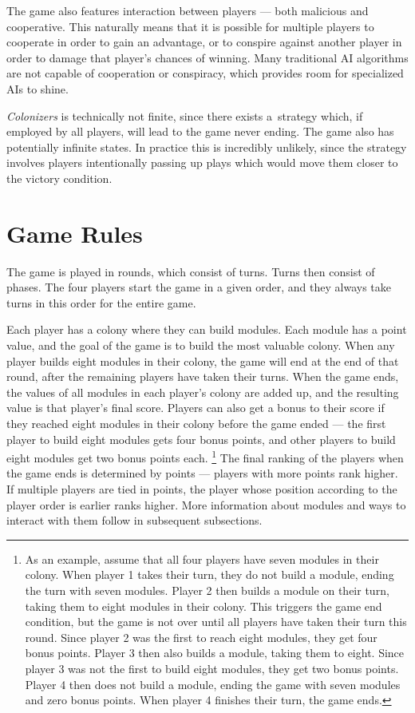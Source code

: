 The game also features interaction between players --- both malicious and cooperative.
This naturally means that it is possible for multiple players to cooperate in order
to gain an advantage, or to conspire against another player in order to damage
that player's chances of winning. Many traditional AI algorithms are not capable
of cooperation or conspiracy, which provides room for specialized AIs to shine.

\emph{Colonizers} is technically not finite, since there exists a~strategy which,
if employed by all players, will lead to the game never ending. The game also
has potentially infinite states. In practice this
is incredibly unlikely, since the strategy involves players intentionally
passing up plays which would move them closer to the victory condition.

\section{Game Rules}
\label{chap:gamerules}

The game is played in rounds, which consist of turns. Turns then consist of phases.
The four players start the game in a given order, and they always take turns
in this order for the entire game.

Each player has a colony where they can build modules.
Each module has a point value, and the goal of the game is to build the most valuable colony.
When any player builds eight modules in their colony, the game will end at the end
of that round, after the remaining players have taken their turns.
When the game ends, the values of all modules in each player's colony
are added up, and the resulting value is that player's final score. Players can also
get a bonus to their score if they reached eight modules in their colony before
the game ended --- the first player to build eight modules gets four bonus points,
and other players to build eight modules get two bonus points each.
\footnote{As an example, assume that all four players have seven modules in their colony.
When player 1 takes their turn, they do not build a module, ending the turn with seven modules.
Player 2 then builds a module on their turn, taking them to eight modules in their colony.
This triggers the game end condition, but the game is not over until all players have taken
their turn this round. Since player 2 was the first to reach eight modules, they get four
bonus points. Player 3 then also builds a module, taking them to eight. Since player 3
was not the first to build eight modules, they get two bonus points. Player 4 then does
not build a module, ending the game with seven modules and zero bonus points. When player 4
finishes their turn, the game ends.}
The final ranking of the players when the game ends is determined by points --- players
with more points rank higher. If multiple players are tied in points, the player whose
position according to the player order is earlier ranks higher.
More information about modules and ways to interact with them follow in subsequent subsections.

